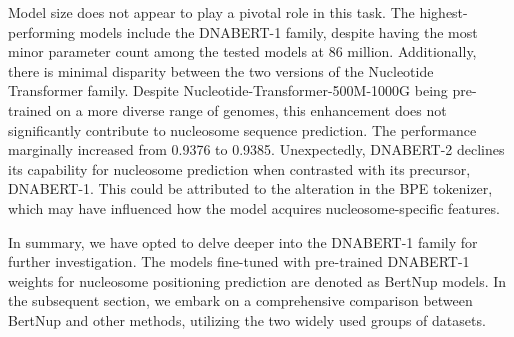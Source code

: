 \documentclass[a4paper,fleqn]{cas-dc}
\begin{document}
Model size does not appear to play a pivotal role in this task. The highest-performing models include the DNABERT-1 family, despite having the most minor parameter count among the tested models at 86 million. Additionally, there is minimal disparity between the two versions of the Nucleotide Transformer family. Despite Nucleotide-Transformer-500M-1000G being pre-trained on a more diverse range of genomes, this enhancement does not significantly contribute to nucleosome sequence prediction. The performance marginally increased from 0.9376 to 0.9385. Unexpectedly, DNABERT-2 declines its capability for nucleosome prediction when contrasted with its precursor, DNABERT-1. This could be attributed to the alteration in the BPE tokenizer, which may have influenced how the model acquires nucleosome-specific features.

In summary, we have opted to delve deeper into the DNABERT-1 family for further investigation. The models fine-tuned with pre-trained DNABERT-1 weights for nucleosome positioning prediction are denoted as BertNup models. In the subsequent section, we embark on a comprehensive comparison between BertNup and other methods, utilizing the two widely used groups of datasets.
\end{document}

